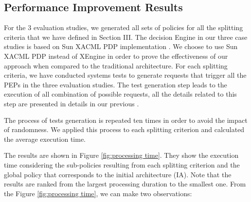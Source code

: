 \subsection{Performance Improvement Results}
For the 3 evaluation studies, we generated all sets of policies for all the splitting criteria that we have defined in Section III.
The decision Engine in our three case studies is based on Sun XACML PDP implementation \cite{sunxacml}. We choose to use Sun XACML PDP instead of XEngine in order 
to prove the effectiveness of our approach when compared to the traditional architecture.
For each splitting criteria, we have conducted systems tests to generate 
requests that trigger all the PEPs in the three evaluation studies. The test generation step leads to the execution of all combination of possible requests, 
all the details related to this step are presented in details in our previous \cite{testcase}.
  
The process of tests generation is repeated ten times in order to avoid the impact of randomness.
We applied this process to each splitting criterion and calculated the average execution time.


The results are shown in Figure \ref{fig:processing time}. They show the execution time considering the sub-policies resulting from each splitting criterion and the global policy 
that corresponds to the initial architecture (IA). Note that the results are ranked from the largest processing duration to the smallest one. 
From the Figure \ref{fig:processing time}, we can make two observations:

